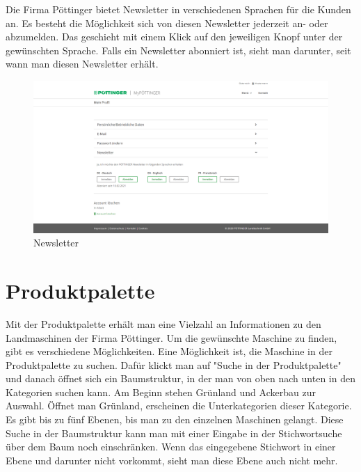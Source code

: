 Die Firma Pöttinger bietet Newsletter in verschiedenen Sprachen für die Kunden an. Es besteht die Möglichkeit sich von diesen Newsletter jederzeit an- oder abzumelden. Das geschieht mit einem Klick auf den jeweiligen Knopf unter der gewünschten Sprache. Falls ein Newsletter abonniert ist, sieht man darunter, seit wann man diesen Newsletter erhält.

\begin{figure}[H]
	\centerline{
		\includegraphics[width=1\textwidth]{./grafiken/erm_profil_newsletter.png}
	}
	\vskip0pt
	\caption{Newsletter} \label{fig:newsletter}
\end{figure}

\section{Produktpalette}

Mit der Produktpalette erhält man eine Vielzahl an Informationen zu den Landmaschinen der Firma Pöttinger. Um die gewünschte Maschine zu finden, gibt es verschiedene Möglichkeiten. Eine Möglichkeit ist, die Maschine in der Produktpalette zu suchen. Dafür klickt man auf "Suche in der Produktpalette" und danach öffnet sich ein Baumstruktur, in der man von oben nach unten in den Kategorien suchen kann. Am Beginn stehen Grünland und Ackerbau zur Auswahl. Öffnet man Grünland, erscheinen die Unterkategorien dieser Kategorie. Es gibt bis zu fünf Ebenen, bis man zu den einzelnen Maschinen gelangt. Diese Suche in der Baumstruktur kann man mit einer Eingabe in der Stichwortsuche über dem Baum noch einschränken. Wenn das eingegebene Stichwort in einer Ebene und darunter nicht vorkommt, sieht man diese Ebene auch nicht mehr.

